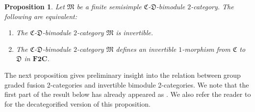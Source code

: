 \documentclass[pdftex]{sigma}
\newtheorem{Proposition}[Theorem]{Proposition}
{ \theoremstyle{definition}
\newtheorem{Definition}[Theorem]{Definition}
\newtheorem{Note}[Theorem]{Note}
\newtheorem{Construction}[Theorem]{Construction}
\newtheorem{Example}[Theorem]{Example}
\newtheorem{Remark}[Theorem]{Remark} }
\numberwithin{equation}{section}
\begin{document}
\begin{Proposition}\label{prop:invertibilitycharacterization}
Let $\mathfrak{M}$ be a finite semisimple $\mathfrak{C}$-$\mathfrak{D}$-bimodule $2$-category. The following are equivalent:
\begin{enumerate}\itemsep=0pt
 \item[$(1)$] The $\mathfrak{C}$-$\mathfrak{D}$-bimodule $2$-category $\mathfrak{M}$ is invertible.
 \item[$(2)$] The $\mathfrak{C}$-$\mathfrak{D}$-bimodule $2$-category $\mathfrak{M}$ defines an invertible $1$-morphism from $\mathfrak{C}$ to $\mathfrak{D}$ in $\mathbf{F2C}$.
\end{enumerate}
\end{Proposition}

The next proposition gives preliminary insight into the relation between group graded fusion 2-categories and invertible bimodule 2-categories. We note that the first part of the result below has already appeared as \cite[Proposition~3.1.7]{DY23}. We also refer the reader to \cite[Theorem~6.1]{ENO2} for the decategorified version of this proposition.
\end{document}
